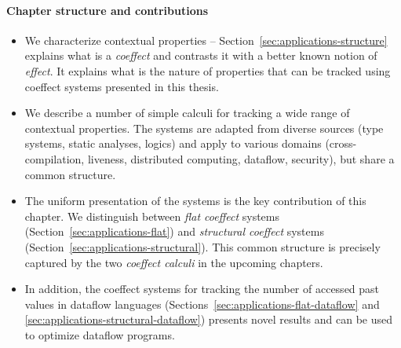 \paragraph{Chapter structure and contributions}
\begin{itemize}
\item We characterize contextual properties -- Section~\ref{sec:applications-structure}
  explains what is a \emph{coeffect} and contrasts it with a better known notion of
  \emph{effect}. It explains what is the nature of properties that can be tracked using
  coeffect systems presented in this thesis.

\item We describe a number of simple calculi for tracking a wide range of contextual properties.
  The systems are adapted from diverse sources (type systems, static analyses, logics) and apply to
  various domains (cross-compilation, liveness, distributed computing, dataflow, security), but
  share a common structure.

\item The uniform presentation of the systems is the key contribution of this chapter. We distinguish
  between \emph{flat coeffect} systems (Section~\ref{sec:applications-flat}) and \emph{structural coeffect}
  systems (Section~\ref{sec:applications-structural}). This common structure is precisely
  captured by the two \emph{coeffect calculi} in the upcoming chapters.

\item In addition, the coeffect systems for tracking the number of accessed past values in
  dataflow languages (Sections~\ref{sec:applications-flat-dataflow} and \ref{sec:applications-structural-dataflow})
  presents novel results and can be used to optimize dataflow programs.
\end{itemize}



%
%

